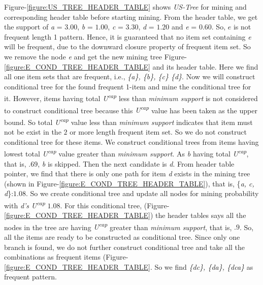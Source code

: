 \documentclass[conference]{IEEEtran}
\begin{document}
Figure-\ref{figure:US_TREE_HEADER_TABLE} shows \emph{US-Tree} for mining and corresponding header table before starting mining. From the header table, we get the support of \emph{a} = $3.00$, \emph{b} = $1.00$, \emph{c} = $3.30$, \emph{d} = $1.20$ and \emph{e} = $0.60$. So, \emph{$e$} is not frequent length 1 pattern. Hence, it is guaranteed that no item set containing \emph{e} will be frequent, due to the downward closure property of frequent item set. So we remove the node \emph{e} and get the new mining tree Figure-\ref{figure:E_COND_TREE_HEADER_TABLE} and its header table. Here we find all one item sets that are frequent, i.e., \emph{\{a\}, \{b\}, \{c\} \{d\}}. Now we will construct conditional tree for the found frequent 1-item and mine the conditional tree for it. However, items having total \emph{U\textsuperscript{cap}} less than \emph{minimum support} is not considered to construct conditional tree because this \emph{U\textsuperscript{cap}} value has been taken as the upper bound. So total \emph{U\textsuperscript{cap}} value less than \emph{minimum support} indicates that item must not be exist in the $2$ or more length frequent item set. So we do not construct conditional tree for these items.
We construct conditional trees from items having lowest total \emph{U\textsuperscript{cap}} value greater than \emph{minimum support}. As \emph{b} having total \emph{U\textsuperscript{cap}}, that is, $.69$, \emph{b} is skipped. Then the next candidate is \emph{d}. From header table pointer, we find that there is only one path for item \emph{d} exists in the mining tree (shown in Figure-\ref{figure:E_COND_TREE_HEADER_TABLE}), that is, \{\emph{a, c, d}\}:$1.08$. So we create conditional tree and update all nodes for mining probability with \emph{d's} \emph{U\textsuperscript{cap}} $1.08$. For this conditional tree, (Figure-\ref{figure:E_COND_TREE_HEADER_TABLE}) the header tables says all the nodes in the tree are having \emph{U\textsuperscript{cap}} greater than \emph{minimum support}, that is, $.9$. So, all the items are ready to be constructed as conditional tree. Since only one branch is found, we do not further construct conditional tree and take all the combinations as frequent items (Figure-\ref{figure:E_COND_TREE_HEADER_TABLE}. So we find \emph{\{dc\}, \{da\}, \{dca\}} as frequent pattern. 
\end{document}
